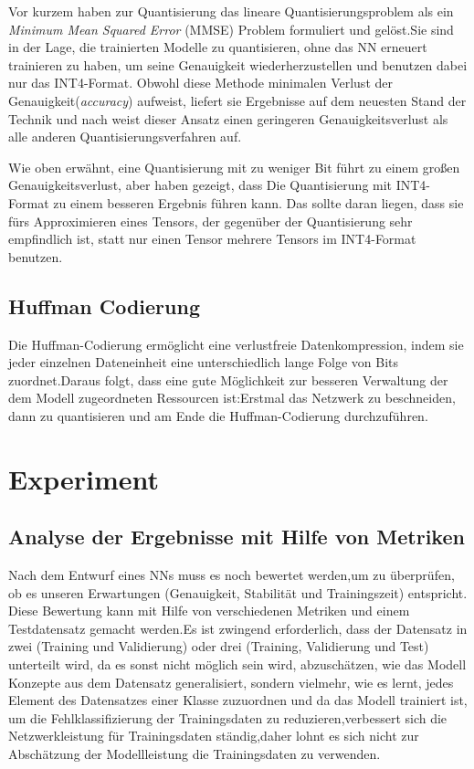 \documentclass[12pt,a4paper]{scrartcl}
\numberwithin{equation}{section}
\begin{document}
Vor kurzem haben \cite[Yoni et al]{quantizationYoni} zur  Quantisierung  das lineare Quantisierungsproblem als ein \textit{Minimum Mean Squared Error} (MMSE) Problem formuliert und gelöst.Sie sind in der Lage, die trainierten Modelle zu quantisieren, ohne das \ac{NN} erneuert trainieren zu haben, um seine Genauigkeit wiederherzustellen und benutzen dabei nur das INT4-Format. Obwohl diese Methode  minimalen Verlust der Genauigkeit(\textit{accuracy}) aufweist, liefert sie Ergebnisse auf dem neuesten Stand der Technik und nach \cite{quantizationYoni} weist dieser Ansatz einen geringeren Genauigkeitsverlust als alle anderen Quantisierungsverfahren auf.

Wie oben erwähnt, eine Quantisierung mit zu weniger Bit führt zu einem großen Genauigkeitsverlust, aber \cite[Yoni et al]{quantizationYoni} haben gezeigt, dass Die Quantisierung mit INT4-Format zu einem besseren Ergebnis führen kann. Das sollte daran liegen, dass sie fürs Approximieren eines Tensors, der gegenüber der Quantisierung sehr empfindlich ist, statt nur einen Tensor mehrere Tensors im INT4-Format benutzen.

\subsection{Huffman Codierung}
Die Huffman-Codierung ermöglicht eine verlustfreie Datenkompression, indem sie jeder einzelnen Dateneinheit  eine unterschiedlich lange Folge von Bits zuordnet.Daraus folgt, dass eine gute Möglichkeit zur besseren Verwaltung der dem Modell zugeordneten Ressourcen ist:Erstmal das Netzwerk zu beschneiden, dann zu quantisieren und am Ende die Huffman-Codierung durchzuführen. 

\section{Experiment} \label{Experiment}

\subsection{Analyse der Ergebnisse mit Hilfe von Metriken}
Nach dem Entwurf eines \acsp{NN} muss es noch bewertet werden,um zu überprüfen, ob es unseren Erwartungen (Genauigkeit, Stabilität und Trainingszeit) entspricht. Diese Bewertung kann mit Hilfe von verschiedenen Metriken und einem Testdatensatz gemacht werden.Es ist zwingend erforderlich, dass der Datensatz in zwei (Training und Validierung) oder drei (Training, Validierung und Test) unterteilt wird, da es sonst nicht möglich sein wird, abzuschätzen, wie das Modell Konzepte aus dem Datensatz generalisiert, sondern vielmehr, wie es lernt, jedes Element des Datensatzes einer Klasse zuzuordnen und da das Modell trainiert ist, um die Fehlklassifizierung der Trainingsdaten zu reduzieren,verbessert sich die Netzwerkleistung für Trainingsdaten ständig,daher lohnt es sich nicht zur Abschätzung der Modellleistung die Trainingsdaten zu verwenden.
\end{document}
